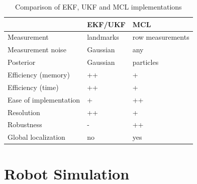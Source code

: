 \documentclass[10pt,journal,compsoc]{IEEEtran}
\begin{document}
\begin{table}[h]
\caption{Comparison of EKF, UKF and MCL implementations}
\label{tab:comp}
\begin{center}
\begin{tabular}{|l||l|l|}
\hline
& EKF/UKF & MCL\\
\hline
Measurement & landmarks & row measurements\\
Measurement noise  & Gaussian & any\\
Posterior & Gaussian & particles\\
Efficiency (memory) & ++ &+\\
Efficiency (time) & ++ & +\\
Ease of implementation & + & ++\\
Resolution & ++ & +\\
Robustness & - & ++\\
Global localization & no & yes\\
\hline
\end{tabular}
\end{center}
\end{table}




%
%



%

\section{Robot Simulation}
\end{document}
